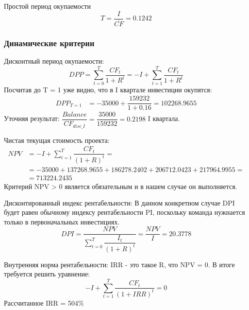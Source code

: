 	Простой период окупаемости
	\begin{equation}
	T = \dfrac{I}{\overline{CF}} = 0.1242
	\end{equation}
	
	\subsubsection{Динамические критерии}
	Дисконтный период окупаемости:
	\begin{equation}
	DPP = \sum_{t = 0}^{T} \dfrac{CF_t}{1 + R^t} = -I + \sum_{t = 1}^{T} \dfrac{CF_t}{1 + R^t}
	\end{equation}
	Посчитав до T = 1 уже видно, что в I квартале инвестиции окупятся:
	\begin{equation}
	\begin{aligned}
	DPP_{T = 1} &= -35000 + \dfrac{159232}{1 + 0.16} = 102268.9655
	\end{aligned}				
	\end{equation} 
	Уточняя результат: $\dfrac{Balance}{CF_{disc\_I}} = \dfrac{35000}{159232} = 0.2198$ I квартала.
	
	Чистая текущая стоимость проекта:
	\begin{equation}
	\begin{aligned}
	NPV &= -I + \sum_{t = 1}^{T} \dfrac{CF_t}{(1 + R)^t} =\\
	&= -35000 + 137268.9655 + 186278.2402 + 206712.0423 + 217964.9955 =\\ 
	&= 713224.2435
	\end{aligned}
	\end{equation}	
	Критерий NPV > 0 является обязательным и в нашем случае он выполняется.
	
	Дисконтированный индекс рентабельности:
	В данном конкретном случае DPI будет равен обычному индексу рентабельности PI, поскольку команда нужнается только в первоначальных инвестициях.
	\begin{equation}
	DPI = \dfrac{NPV}{\sum_{t = 0}^{T} \dfrac{I_t}{(1 + R)^t}} = \dfrac{NPV}{I} = 20.3778
	\end{equation}
	
	Внутренняя норма рентабельности:
	IRR - это такое R, что NPV = 0. В итоге требуется решить уравнение:
	\begin{equation}
	-I + \sum_{t = 1}^{T} \dfrac{CF_t}{(1 + IRR)^t} = 0
	\end{equation}	
	Рассчитанное IRR = 504\%
